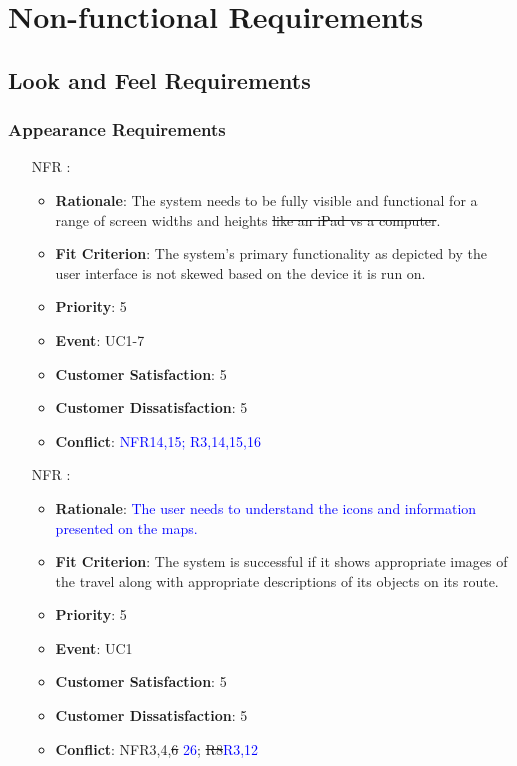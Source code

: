 \documentclass[12pt, titlepage]{article}
\newcounter{reqnum} %
\newcounter{freqnum} %
\begin{document}
\section{Non-functional Requirements}

\subsection{Look and Feel Requirements}


\subsubsection{Appearance Requirements}
\begin{itemize}
\item[NFR\refstepcounter{freqnum}\thefreqnum
\label{NFR}:] 
\begin{itemize}
    \item \textbf{Rationale}: The system needs to be fully visible and functional for a range of screen widths and heights\sout{ like an iPad vs a computer}.
    \item \textbf{Fit Criterion}: The system's primary functionality as depicted by the user interface is not skewed based on the device it is run on.
    \item \textbf{Priority}: 5
    \item \textbf{Event}: UC1-7 %
    \item \textbf{Customer Satisfaction}: 5
    \item \textbf{Customer Dissatisfaction}: 5
    \item \textbf{Conflict}: \textcolor{blue}{NFR14,15; R3,14,15,16}
\end{itemize}
\item[NFR\refstepcounter{freqnum}\thefreqnum
\label{NFR}:] 
\begin{itemize}
    \item \textbf{Rationale}: \textcolor{blue}{The user needs to understand the icons and information presented on the maps.}
    \item \textbf{Fit Criterion}: The system is successful if it shows appropriate images of the travel along with appropriate descriptions of its objects on its route.
    \item \textbf{Priority}: 5
    \item \textbf{Event}: UC1 %
    \item \textbf{Customer Satisfaction}: 5
    \item \textbf{Customer Dissatisfaction}: 5
    \item \textbf{Conflict}: NFR3,4,\sout{6} \textcolor{blue}{26}; \sout{R8}\textcolor{blue}{R3,12}
\end{itemize}


\end{itemize}
\end{document}
